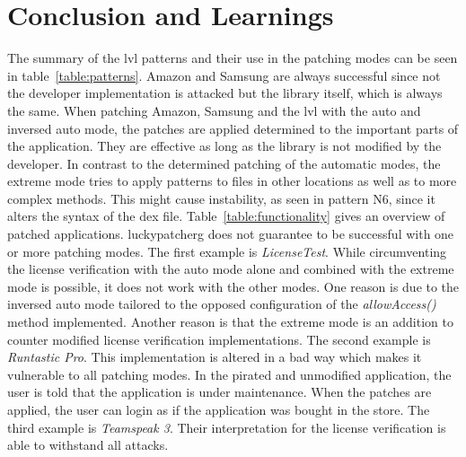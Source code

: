 \section{Conclusion and Learnings} \label{section:luckypatcher-learnings}
The summary of the \gls{lvl} patterns and their use in the patching modes can be seen in table~\ref{table:patterns}.
Amazon and Samsung are always successful since not the developer implementation is attacked but the library itself, which is always the same.
\newline
When patching Amazon, Samsung and the \gls{lvl} with the auto and inversed auto mode, the patches are applied determined to the important parts of the application.
They are effective as long as the library is not modified by the developer.
In contrast to the determined patching of the automatic modes, the extreme mode tries to apply patterns to files in other locations as well as to more complex methods.
This might cause instability, as seen in pattern N6, since it alters the syntax of the dex file.
\newline
\newline
Table~\ref{table:functionality} gives an overview of patched applications.
\gls{luckypatcherg} does not guarantee to be successful with one or more patching modes.
\newline
The first example is \textit{LicenseTest}.
While circumventing the license verification with the auto mode alone and combined with the extreme mode is possible, it does not work with the other modes.
One reason is due to the inversed auto mode tailored to the opposed configuration of the \textit{allowAccess()} method implemented.
Another reason is that the extreme mode is an addition to counter modified license verification implementations.
\newline
The second example is \textit{Runtastic Pro}.
This implementation is altered in a bad way which makes it vulnerable to all patching modes.
In the pirated and unmodified application, the user is told that the application is under maintenance.
When the patches are applied, the user can login as if the application was bought in the store.
\newline
The third example is \textit{Teamspeak 3}.
Their interpretation for the license verification is able to withstand all attacks.
\newline
